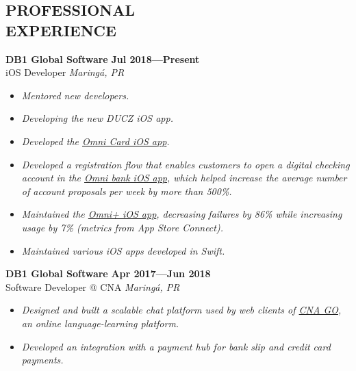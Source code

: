 \documentclass[line,margin]{res}
\begin{document}


\address{\sl \href{https://marcosatanaka.com}{marcosatanaka.com} --- \href{mailto:marcosatanaka@gmail.com}{marcosatanaka@gmail.com}}


\begin{resume}


\section{PROFESSIONAL \\ EXPERIENCE}
  {\bf DB1 Global Software} \hfill {\bf Jul 2018---Present} \\
  iOS Developer \hfill {\sl Maring\'a, PR}\\[-6pt]
  \begin{itemize}
    \item {\sl Mentored new developers.}
    \item {\sl Developing the new DUCZ iOS app.}
    \item {\sl Developed the \href{https://apps.apple.com/us/app/id1490242421}{Omni Card iOS app}.}
    \item {\sl Developed a registration flow that enables customers to open a digital checking account in the \href{https://apps.apple.com/br/app/omni-banco/id1369601365}{Omni bank iOS app}, which helped increase the average number of account proposals per week by more than 500\%.}
    \item {\sl Maintained the \href{https://apps.apple.com/br/app/omni/id1276332750}{Omni+ iOS app}, decreasing failures by 86\% while increasing usage by 7\% (metrics from App Store Connect).}
    \item {\sl Maintained various iOS apps developed in Swift.}
  \end{itemize}

  {\bf DB1 Global Software} \hfill {\bf Apr 2017---Jun 2018} \\
  Software Developer @ CNA \hfill {\sl Maring\'a, PR}\\[-6pt]
  \begin{itemize}
    \item {\sl Designed and built a scalable chat platform used by web clients of \href{https://www.cnago.com.br}{CNA GO}, an online language-learning platform.}
    \item {\sl Developed an integration with a payment hub for
               bank slip and credit card payments.}
  \end{itemize}


\end{resume}
\end{document}
